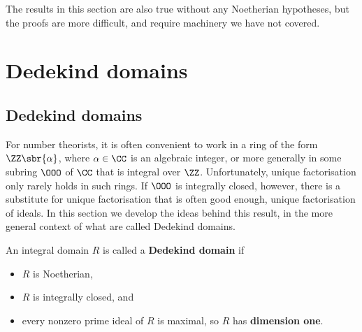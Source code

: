 \begin{note*}
The results in this section are also true without any Noetherian hypotheses, but the proofs are more difficult, and require machinery we have not covered.
\end{note*}

\pagebreak

\section{Dedekind domains}

\subsection{Dedekind domains}


For number theorists, it is often convenient to work in a ring of the form $ \ZZ\sbr{\alpha} $, where $ \alpha \in \CC $ is an algebraic integer, or more generally in some subring $ \OOO $ of $ \CC $ that is integral over $ \ZZ $. Unfortunately, unique factorisation only rarely holds in such rings. If $ \OOO $ is integrally closed, however, there is a substitute for unique factorisation that is often good enough, unique factorisation of ideals. In this section we develop the ideas behind this result, in the more general context of what are called Dedekind domains.

\begin{definition}
An integral domain $ R $ is called a \textbf{Dedekind domain} if
\begin{itemize}
\item $ R $ is Noetherian,
\item $ R $ is integrally closed, and
\item every nonzero prime ideal of $ R $ is maximal, so $ R $ has \textbf{dimension one}.
\end{itemize}
\end{definition}

